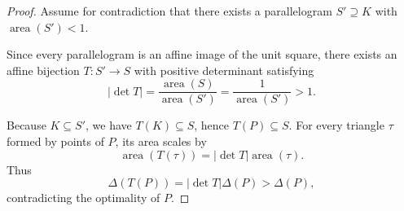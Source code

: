 \documentclass[10pt,a4paper]{amsart}
\begin{document}
\begin{proof}
Assume for contradiction that there exists a parallelogram $S' \supseteq K$
with $\operatorname{area}(S') < 1$.

Since every parallelogram is an affine image of the unit square,
there exists an affine bijection $T: S' \to S$
with positive determinant satisfying
\[
|\det T| = \frac{\operatorname{area}(S)}{\operatorname{area}(S')}
= \frac{1}{\operatorname{area}(S')} > 1.
\]

Because $K \subseteq S'$, we have $T(K) \subseteq S$, hence $T(P) \subseteq S$.
For every triangle $\tau$ formed by points of $P$,
its area scales by
\[
\operatorname{area}(T(\tau))
= |\det T| \operatorname{area}(\tau).
\]
Thus
\[
\Delta(T(P))
= |\det T| \Delta(P)
> \Delta(P),
\]
contradicting the optimality of $P$.
\end{proof}
\end{document}
